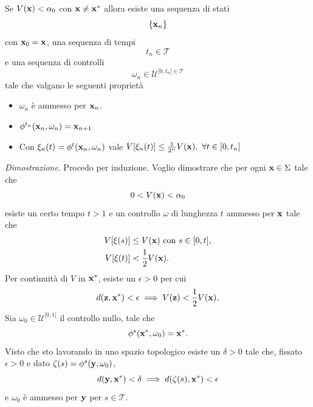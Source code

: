 \begin{steps}
    \begin{aff}
        Se $V(\mathbf{x}) < \alpha_0$ con $\mathbf{x} \neq \mathbf{x}^*$ allora esiste
        una sequenza di stati
        \begin{equation*}
        \{\mathbf{x}_n\}
        \end{equation*}
        con $\mathbf{x}_0 = \mathbf{x}$, una sequenza di tempi
        \begin{equation*}
        t_n \in \mathcal T
        \end{equation*}
        e una sequenza di controlli
        \begin{equation*}
            \omega_n \in \mathcal U^{[0, t_n[ \in \mathcal T}
        \end{equation*}
        tale che valgano le seguenti proprietà
        \begin{itemize}
            \item $\omega_n$ è ammesso per $\mathbf{x}_n$.
            \item $\phi^{t_n}(\mathbf{x}_n, \omega_n) = \mathbf{x}_{n+1}$
            \item Con $\xi_n(t) = \phi^t(\mathbf{x}_n, \omega_n)$ vale $V[\xi_n(t)] \leq \frac 1 {2^n} V(\mathbf{x}), \ \forall t \in [0, t_n]$
        \end{itemize}
    \end{aff}
    \emph{Dimostrazione}.
    Procedo per induzione.
    Voglio dimostrare che  per ogni $\mathbf{x} \in \Sigma$ tale che
    \begin{equation*}
        0 < V(\mathbf{x}) < \alpha_0
    \end{equation*}
    esiste un certo tempo $t > 1$ e un controllo $\omega$
    di lunghezza $t$ ammesso per $\mathbf{x}$ tale che
    \begin{align*}
        V[\xi(s)] &\leq V(\mathbf{x}) \text{ con } s \in [0, t], \\
        V[\xi(t)] &< \frac 1 2 V(\mathbf{x}).
    \end{align*}
    Per continuità di $V$ in $\mathbf{x}^*$, esiste un $\epsilon > 0$ per cui
    \begin{equation}
        d(\mathbf{z}, \mathbf{x}^*) < \epsilon \implies V(\mathbf{z}) < \frac 1 2 V(\mathbf{x}).
        \label{eq:dzxstar}
    \end{equation}
    Sia $\omega_0 \in \mathcal U^{[0, 1[}$ il controllo nullo,
    tale che
    \begin{equation*}
        \phi^s(\mathbf{x}^*, \omega_0) = \mathbf{x}^*.
    \end{equation*}
    Visto che sto lavorando in uno spazio topologico
    esiste un $\delta > 0$ tale che, fissato $\epsilon > 0$ e
    dato $\zeta(s) = \phi^s(\mathbf{y}, \omega_0)$,
    \begin{equation*}
        d(\mathbf{y}, \mathbf{x}^*) < \delta \implies d(\zeta(s), \mathbf{x}^*) < \epsilon
    \end{equation*}
    e $\omega_0$ è ammesso per $\mathbf{y}$ per $s \in \mathcal T$.


\end{steps}
